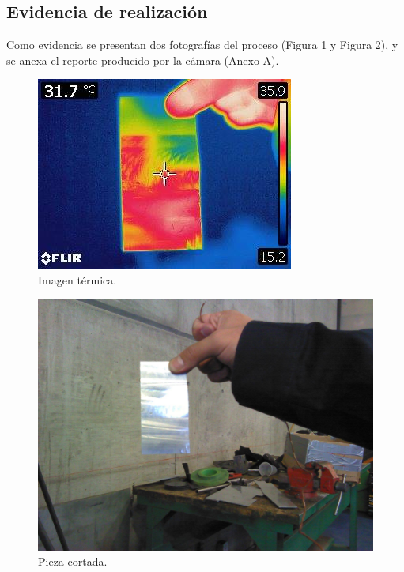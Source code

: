 
\subsection{Evidencia de realizaci\'on}
Como evidencia se presentan dos fotograf\'ias del proceso (Figura 1 y Figura 2), y se anexa el reporte producido
por la c\'amara (Anexo A).

 \begin{figure}[!htbp]
 \centering
 \includegraphics [scale=1]
 {./img/13115323_10208233760737222_581857646_n.jpg}
 \caption{Imagen t\'ermica.}
 \end{figure}

 \begin{figure}[!htbp]
 \centering
 \includegraphics [scale=0.15]
 {./img/13148168_10208233760857225_455642844_o.jpg}
 \caption{Pieza cortada.}
 \end{figure}

